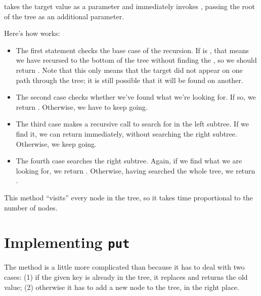 \documentclass[12pt]{book}
\theoremstyle{exercise}
\begin{document}
 takes the target value as a parameter and
immediately invokes , passing the root of
the tree as an additional parameter.


Here's how  works:

\begin{itemize}

\item
  The first  statement checks the base case of the recursion.
  If  is , that means we have recursed to the
  bottom of the tree without finding the , so we should
  return . Note that this only means that the target did
  not appear on one path through the tree; it is still possible that it
  will be found on another.

\item
  The second case checks whether we've found what we're looking for. If
  so, we return . Otherwise, we have to keep going.

\item
  The third case makes a recursive call to search for  in
  the left subtree. If we find it, we can return 
  immediately, without searching the right subtree. Otherwise, we keep
  going.

\item
  The fourth case searches the right subtree. Again, if we find what we
  are looking for, we return . Otherwise, having searched
  the whole tree, we return .

\end{itemize}

This method ``visits'' every node in the tree, so it takes time
proportional to the number of nodes.



\section{Implementing {\tt put}}
\label{implementing-put}

The  method is a little more complicated than 
because it has to deal with two cases: (1) if the given key is already
in the tree, it replaces and returns the old value; (2) otherwise it has
to add a new node to the tree, in the right place.

\end{document}

